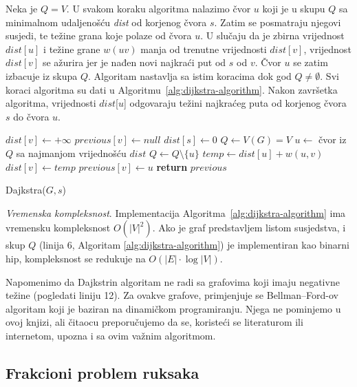 \documentclass[a4paper, utf8, 11pt, colorlinks]{book}
\begin{document}
Neka je $Q = V$.  
U svakom koraku algoritma nalazimo čvor $u$ koji je u skupu $Q$ sa minimalnom udaljenošću \emph{dist} od korjenog čvora $s$. Zatim se posmatraju njegovi susjedi, te težine grana koje polaze od čvora $u$. U slučaju da je zbirna vrijednost $dist[u]$  i težine grane $w(uv)$ manja od trenutne vrijednosti $dist[v]$, vrijednost $dist[v]$ se ažurira jer je nađen novi najkraći put od $s$ od $v$.  Čvor $u$ se zatim izbacuje iz skupa $Q$. Algoritam nastavlja sa istim koracima dok god $Q \neq \emptyset$. 
Svi koraci algoritma su dati u Algoritmu~\ref{alg:dijkstra-algorithm}. Nakon završetka algoritma, vrijednosti $dist$[$u$] odgovaraju težini najkraćeg puta od korjenog čvora $s$ do čvora $u$. 


\begin{algorithm}[!ht]
	\begin{algorithmic}[1]
	      	\STATE   $dist[v] \gets +\infty$ 	%
		    \STATE $previous[v] \gets null$ 	%
		\ENDFOR
		\STATE	$dist[s] \gets 0$ 	 
		\STATE	$Q \gets V(G)=V$
		\STATE $u \gets$ čvor iz $Q$ sa najmanjom vrijednošću $dist$
		\STATE $Q \gets Q \setminus \{u\}$
		\STATE $temp \gets dist[u] + w(u, v)$
		\STATE  $dist[v] \gets temp$
		\STATE $previous[v] \gets u$ 
		\ENDIF
		\ENDFOR
		\ENDWHILE
		\STATE	\textbf{return} $previous$ 
	\end{algorithmic}
    		\caption{Dajkstra($G,s $)}\label{alg:dijkstra-algorithm}
\end{algorithm}

\emph{Vremenska kompleksnost}.  Implementacija Algoritma~\ref{alg:dijkstra-algorithm} ima vremensku kompleksnost $O(|V|^2)$. Ako je graf predstavljem listom susjedstva, i skup $Q$ (linija 6, Algoritam \ref{alg:dijkstra-algorithm}) je implementiran kao binarni hip, 
kompleksnost se redukuje na $O(|E| \cdot \log |V|)$.

Napomenimo da Dajkstrin algoritam ne radi sa grafovima koji imaju negativne težine (pogledati  liniju 12).  Za ovakve grafove,  primjenjuje se Bellman–Ford-ov algoritam koji je baziran na dinamičkom programiranju. Njega ne pominjemo   u ovoj knjizi, ali čitaocu preporučujemo da se, koristeći se literaturom ili internetom, upozna i sa ovim važnim algoritmom.  %

\subsection{Frakcioni problem ruksaka}
\end{document}
